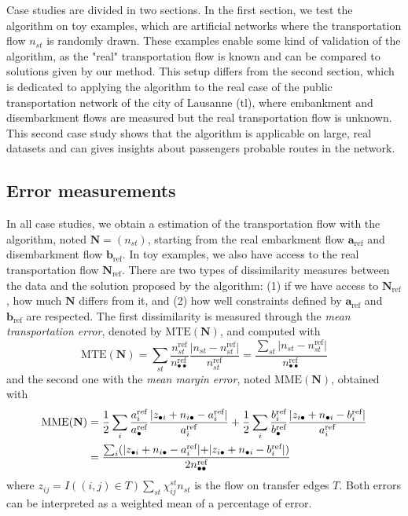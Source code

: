 \documentclass{bmcart}
\begin{document}
Case studies are divided in two sections. In the first section, we test the algorithm on toy examples, which are artificial networks where the transportation flow $n_{st}$ is randomly drawn. These examples enable some kind of validation of the algorithm, as the "real" transportation flow is known and can be compared to solutions given by our method. This setup differs from the second section, which is dedicated to applying the algorithm to the real case of the public transportation network of the city of Lausanne (tl), where embankment and disembarkment flows are measured but the real transportation flow is unknown. This second case study shows that the algorithm is applicable on large, real datasets and can gives insights about passengers probable routes in the network.

\subsection{Error measurements}
\label{error_measures}

In all case studies, we obtain a estimation of the transportation flow with the algorithm, noted $\mathbf{N} = (n_{st})$, starting from the real embarkment flow $\mathbf{a}_\text{ref}$ and disembarkment flow $\mathbf{b}_\text{ref}$. In toy examples, we also have access to the real transportation flow $\mathbf{N}_\text{ref}$. 
There are two types of dissimilarity measures between the data and the solution proposed by the algorithm: (1) if we have access to $\mathbf{N}_\text{ref}$, how much $\mathbf{N}$ differs from it, and (2) how well constraints defined by $\mathbf{a}_\text{ref}$ and $\mathbf{b}_\text{ref}$ are respected. The first dissimilarity is measured through the \emph{mean transportation error}, denoted by $\text{MTE}(\mathbf{N})$, and computed with
\begin{equation}
	\text{MTE}(\mathbf{N}) = \sum_{st} \frac{n^\text{ref}_{st}}{n^\text{ref}_{\bullet \bullet}} \frac{\lvert n_{st} - n^\text{ref}_{st}\lvert}{n^\text{ref}_{st}} = \frac{\sum_{st} \lvert n_{st} - n^\text{ref}_{st}\lvert}{n^\text{ref}_{\bullet \bullet}} 
	\label{MTE}
\end{equation} 
and the second one with the \emph{mean margin error}, noted $\text{MME}(\mathbf{N})$, obtained with
\begin{align}
	\text{MME}(\mathbf{N}) &= \frac{1}{2} \sum_{i} \frac{a^\text{ref}_i}{a^\text{ref}_\bullet} \frac{\lvert z_{\bullet i} + n_{i \bullet} - a^\text{ref}_i \lvert}{a^\text{ref}_i} + \frac{1}{2} \sum_{i} \frac{b^\text{ref}_i}{b^\text{ref}_\bullet} \frac{\lvert z_{i \bullet} + n_{\bullet i} - b^\text{ref}_i \lvert}{a^\text{ref}_i} \notag \\
	&= \frac{\sum_i (\lvert z_{\bullet i} + n_{i \bullet} - a^\text{ref}_i \lvert + \lvert z_{i \bullet} + n_{\bullet i} - b^\text{ref}_i \lvert)}{2n^\text{ref}_{\bullet \bullet}}
	\label{MME}
\end{align} 
where $z_{ij} = I((i,j) \in T)\sum_{st} \chi_{ij}^{st} n_{st}$ is the flow on transfer edges $T$. Both errors can be interpreted as a weighted mean of a percentage of error.
\end{document}
